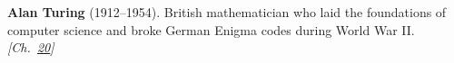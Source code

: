 \textbf{Alan Turing} (1912–1954). British mathematician who laid the foundations of computer science and broke German Enigma codes during World War II. \emph{[Ch.~\hyperref[ch:chineseroomargument]{20}]}

